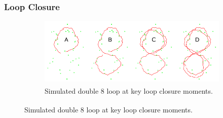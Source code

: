 \subsubsection{Loop Closure}
\begin{figure}[H]
    \centering
    \begin{minipage}[t]{0.48\linewidth}
        \vspace{0pt}
        \begin{subfigure}[t]{\linewidth}
            \centering
            \includegraphics[width=\linewidth,height=0.47\textheight,keepaspectratio]{Pictures/Optimizers/iSAM/Variable_Reordering1.png}
            \caption{Simulated double 8 loop at key loop closure moments.\textsuperscript{\cite{iSAM_paper}}}\label{fig:l-top}
        \end{subfigure}\vspace{4pt}


\end{minipage}
\end{figure}
